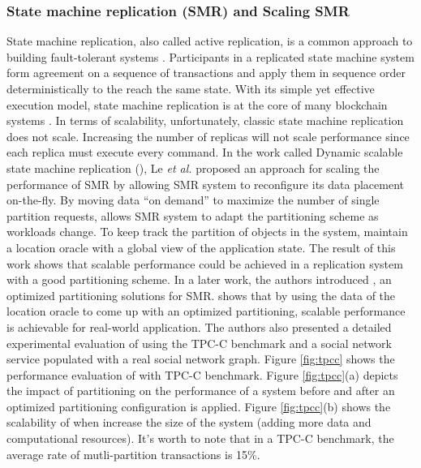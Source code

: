 \subsubsection{State machine replication (SMR) and Scaling SMR}
State machine replication, also called active replication, is a common approach
to building fault-tolerant systems \cite{Lam78, Sch90}. Participants in a
replicated state machine system form agreement on a sequence of transactions and
apply them in sequence order deterministically to the reach the same state. With
its simple yet effective execution model, state machine replication is at the
core of many blockchain systems \cite{baudet2019state, cachin2016architecture}.
In terms of scalability, unfortunately, classic state machine replication does
not scale. Increasing the number of replicas will not scale performance since
each replica must execute every command. In the work called Dynamic scalable
state machine replication (\dssmr), Le \emph{et al.} proposed an approach for
scaling the performance of SMR by allowing SMR system to reconfigure its data
placement on-the-fly. By moving data ``on demand'' to maximize the number of
single partition requests, \dssmr{} allows SMR system to adapt the partitioning
scheme as workloads change. To keep track the partition of objects in the
system, \dssmr{} maintain a location oracle with a global view of the
application state. The result of this work shows that scalable performance could
be achieved in a replication system with a good partitioning scheme. In a later
work, the authors introduced \dynastar, an optimized partitioning solutions for
SMR. \dynastar shows that by using the data of the location oracle to come up
with an optimized partitioning, scalable performance is achievable for
real-world application. The authors also presented a detailed experimental
evaluation of \dynastar using the TPC-C benchmark and a social network service
populated with a real social network graph. Figure \ref{fig:tpcc} shows the
performance evaluation of \dynastar with TPC-C benchmark. Figure
\ref{fig:tpcc}(a) depicts the impact of partitioning on the performance of a
system before and after an optimized partitioning configuration is applied.
Figure \ref{fig:tpcc}(b) shows the scalability of \dynastar when increase the
size of the system (adding more data and computational resources). It's worth to
note that in a TPC-C benchmark, the average rate of mutli-partition transactions
is 15\%.


